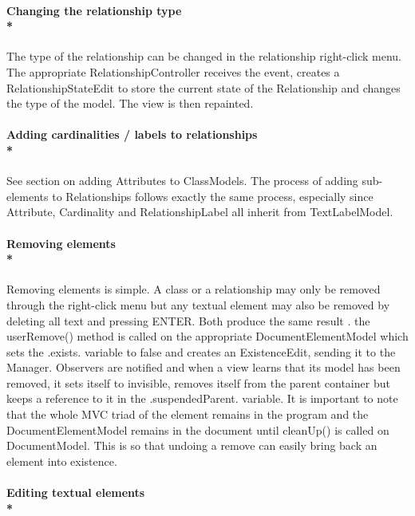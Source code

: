 \paragraph{\small{\tab Changing the relationship type\\*}}

\hspace{-10pt}The type of the relationship can be changed in the relationship right-click menu. The appropriate RelationshipController receives the event, creates a RelationshipStateEdit to store the current state of the Relationship and changes the type of the model. The view is then repainted.

\paragraph{\small{\tab Adding cardinalities / labels to relationships\\*}}

\hspace{-10pt} See section on adding Attributes to ClassModels. The process of adding sub-elements to Relationships follows exactly the same process, especially since Attribute, Cardinality and RelationshipLabel all inherit from TextLabelModel.

\paragraph{\small{\tab Removing elements \\*}}

\hspace{-10pt}Removing elements is simple. A class or a relationship may only be removed through the right-click menu but any textual element may also be removed by deleting all text and pressing ENTER. Both produce the same result . the userRemove() method is called on the appropriate DocumentElementModel which sets the .exists. variable to false and creates an ExistenceEdit, sending it to the Manager. Observers are notified and when a view learns that its model has been removed, it sets itself to invisible, removes itself from the parent container but keeps a reference to it in the .suspendedParent. variable. It is important to note that the whole MVC triad of the element remains in the program and the DocumentElementModel remains in the document until cleanUp() is called on DocumentModel. This is so that undoing a remove can easily bring back an element into existence. 

\paragraph{\small{\tab Editing textual elements\\*}}

